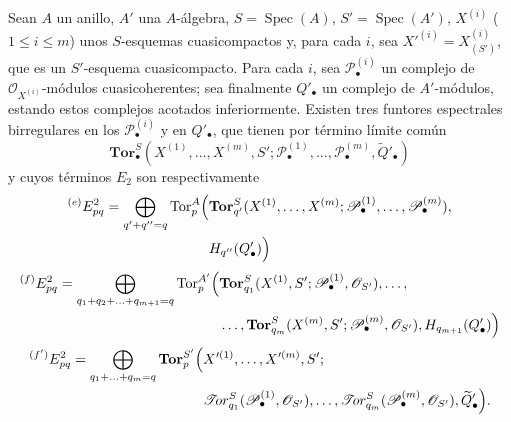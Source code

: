 \begin{corollary}[6.9.4]
\label{III.6.9.4}
Sean $A$ un anillo, $A'$ una $A$-álgebra,
$S=\operatorname{Spec}(A)$, $S'=\operatorname{Spec}(A')$,
$X^{(i)}$ ($1\leq i\leq m$) unos $S$-esquemas cuasicompactos y, para cada
$i$, sea $X'^{(i)}=X_{(S')}^{(i)}$, que es un $S'$-esquema cuasicompacto.
Para cada $i$, sea $\mathscr P_\bullet^{(i)}$ un complejo de
$\mathscr O_{X^{(i)}}$-módulos cuasicoherentes; sea finalmente
$Q'_\bullet$ un complejo de $A'$-módulos, estando estos complejos acotados
inferiormente. Existen tres funtores espectrales birregulares en los
$\mathscr P_\bullet^{(i)}$ y en $Q'_\bullet$, que tienen por término límite
común
\[
  \mathbf{Tor}_\bullet^S
  (X^{(1)},\ldots,X^{(m)},S';
   \mathscr P_\bullet^{(1)},\ldots,\mathscr P_\bullet^{(m)},
   \widetilde{Q}'_\bullet)
\]
y cuyos términos $E_2$ son respectivamente
\[
\begin{split}
  {}^{(e)}E_{pq}^2
  =\bigoplus_{q'+q''=q}
  \operatorname{Tor}_p^A\Bigl(
  &\mathbf{Tor}_{q'}^S
  (X^{(1)},\ldots,X^{(m)};
   \mathscr P_\bullet^{(1)},\ldots,\mathscr P_\bullet^{(m)}),\\
  &H_{q''}(Q'_\bullet)
  \Bigr)
\end{split}
\]
\[
\begin{split}
  {}^{(f)}E_{pq}^2
  =\bigoplus_{q_1+q_2+\ldots+q_{m+1}=q}
  \operatorname{Tor}_p^{A'}\Bigl(
  &\mathbf{Tor}_{q_1}^S
  (X^{(1)},S';\mathscr P_\bullet^{(1)},\mathscr O_{S'}),\ldots,\\
  &\ldots,\mathbf{Tor}_{q_m}^S
  (X^{(m)},S';\mathscr P_\bullet^{(m)},\mathscr O_{S'}),
  H_{q_{m+1}}(Q'_\bullet)
  \Bigr)
\end{split}
\]
\[
\begin{split}
  {}^{(f')}E_{pq}^2
  =\bigoplus_{q_1+\ldots+q_m=q}
  \mathbf{Tor}_p^{S'}\Bigl(
  &X'^{(1)},\ldots,X'^{(m)},S';\\
  &\mathscr{T}\!or_{q_1}^S
  (\mathscr P_\bullet^{(1)},\mathscr O_{S'}),\ldots,
  \mathscr{T}\!or_{q_m}^S
  (\mathscr P_\bullet^{(m)},\mathscr O_{S'}),
  \widetilde{Q}'_\bullet
  \Bigr).
\end{split}
\]
\end{corollary}

